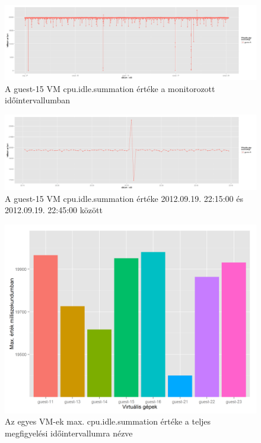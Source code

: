 \documentclass[a4paper,10pt,titlepage]{article}
\begin{document}
\begin{figure}[h!]
\centering
\includegraphics[width=1.00\textwidth]{figures/cpu_idle_summation-guest-15-20120826230140-20120924083120.png}
\caption{A guest-15 VM cpu.idle.summation értéke a monitorozott időintervallumban \label{fig:cpu_idle_summation_g15_1}}
\end{figure}

\begin{figure}[h!]
\centering
\includegraphics[width=1.00\textwidth]{figures/cpu_idle_summation-guest-15-20120919221500-20120919224500.png}
\caption{A guest-15 VM cpu.idle.summation értéke 2012.09.19. 22:15:00 és 2012.09.19. 22:45:00 között \label{fig:cpu_idle_summation_g15_2}}
\end{figure}

\begin{figure}[h!]
\centering
\includegraphics[width=1.00\textwidth]{figures/cpu_idle_summation-max-barchart.png}
\caption{Az egyes VM-ek max. cpu.idle.summation értéke a teljes megfigyelési időintervallumra nézve \label{fig:cpu_idle_summation_max_barchart}}
\end{figure}
\end{document}
